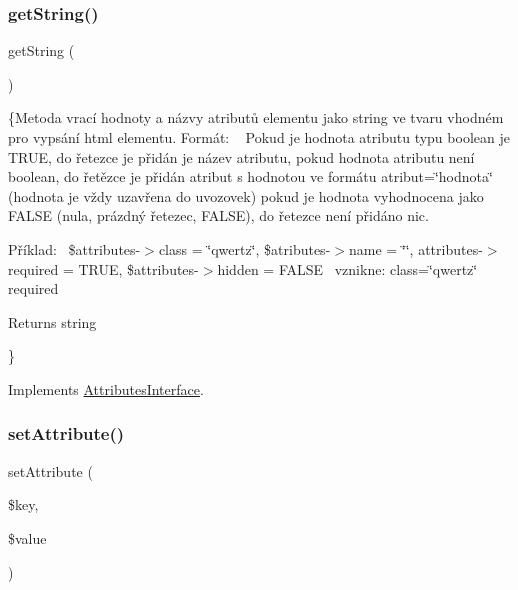 \subsubsection{\texorpdfstring{get\+String()}{getString()}}
{\footnotesize\ttfamily get\+String (\begin{DoxyParamCaption}{ }\end{DoxyParamCaption})}

\{Metoda vrací hodnoty a názvy atributů elementu jako string ve tvaru vhodném pro vypsání html elementu. Formát\+: ~\newline
 Pokud je hodnota atributu typu boolean je T\+R\+UE, do řetezce je přidán je název atributu, pokud hodnota atributu není boolean, do řetězce je přidán atribut s hodnotou ve formátu atribut=\char`\"{}hodnota\char`\"{} (hodnota je vždy uzavřena do uvozovek) pokud je hodnota vyhodnocena jako F\+A\+L\+SE (nula, prázdný řetezec, F\+A\+L\+SE), do řetezce není přidáno nic.

Příklad\+:~\newline
 {\ttfamily \$attributes-\/$>$class = \char`\"{}qwertz\char`\"{}, \$atributes-\/$>$name = \char`\"{}\char`\"{}, attributes-\/$>$required = T\+R\+UE, \$attributes-\/$>$hidden = F\+A\+L\+SE}~\newline
 vznikne\+: class=\char`\"{}qwertz\char`\"{} required

\begin{DoxyReturn}{Returns}
string
\end{DoxyReturn}
\} 

Implements \mbox{\hyperlink{interface_pes_1_1_dom_1_1_node_1_1_attributes_1_1_attributes_interface_afde980915cc78c408e6ac75b662e631c}{Attributes\+Interface}}.

\mbox{\label{class_pes_1_1_dom_1_1_node_1_1_attributes_1_1_attributes_abstract2_a0510466da552b21cc2be4e4c4119a5bb}} 
\subsubsection{\texorpdfstring{set\+Attribute()}{setAttribute()}}
{\footnotesize\ttfamily set\+Attribute (\begin{DoxyParamCaption}\item[{}]{\$key,  }\item[{}]{\$value }\end{DoxyParamCaption})}

